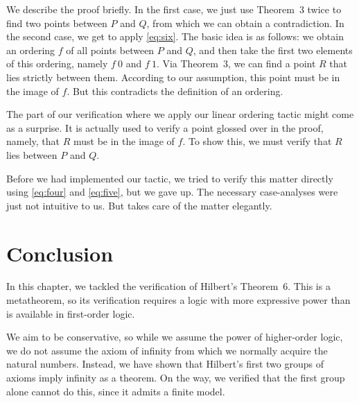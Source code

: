 We describe the proof briefly. In the first case, we just use Theorem~3 twice to find two points between $P$ and $Q$, from which we can obtain a contradiction. In the second case, we get to apply \ref{eq:six}. The basic idea is as follows: we obtain an ordering $f$ of all points between $P$ and $Q$, and then take the first two elements of this ordering, namely $f\ 0$ and $f\ 1$. Via Theorem~3, we can find a point $R$ that lies strictly between them. According to our assumption, this point must be in the image of $f$. But this contradicts the definition of an ordering.

The part of our verification where we apply our linear ordering tactic might come as a surprise. It is actually used to verify a point glossed over in the proof, namely, that $R$ must be in the image of $f$. To show this, we must verify that $R$ lies between $P$ and $Q$.

Before we had implemented our tactic, we tried to verify this matter directly using \ref{eq:four} and \ref{eq:five}, but we gave up. The necessary case-analyses were just not intuitive to us. But  takes care of the matter elegantly.

\linebreak

\section{Conclusion}
In this chapter, we tackled the verification of Hilbert's Theorem~6. This is a metatheorem, so its verification requires a logic with more expressive power than is available in first-order logic. 

We aim to be conservative, so while we assume the power of higher-order logic, we do not assume the axiom of infinity from which we normally acquire the natural numbers. Instead, we have shown that Hilbert's first two groups of axioms imply infinity as a theorem. On the way, we verified that the first group alone cannot do this, since it admits a finite model.

